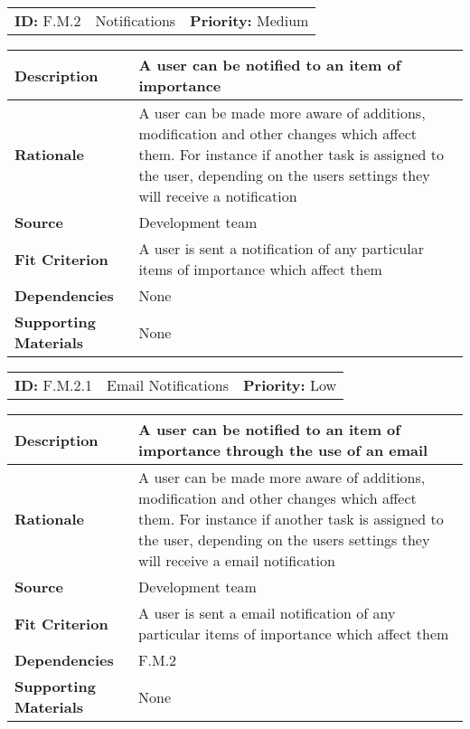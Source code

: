 \begin{table}[H]
    \begin{tabularx}{\textwidth}{| l | X | l |}
        \hline
        \textbf{ID:} F.M.2 & Notifications & \textbf{Priority:} Medium \\
    \end{tabularx}
    \begin{tabularx}{\textwidth}{| l | X |}
        \hline
        \textbf{Description} & A user can be notified to an item of importance \\ \hline
        \textbf{Rationale} & A user can be made more aware of additions, modification and other changes which affect them. For instance if another task is assigned to the user, depending on the users settings they will receive a notification\\ \hline
        \textbf{Source} &  Development team\\ \hline
        \textbf{Fit Criterion} & A user is sent a notification of any particular items of importance which affect them  \\ \hline
        \textbf{Dependencies} & None \\ \hline
        \textbf{Supporting Materials} & None \\ \hline
    \end{tabularx}
\end{table}

\begin{table}[H]
    \begin{tabularx}{\textwidth}{| l | X | l |}
        \hline
        \textbf{ID:} F.M.2.1 & Email Notifications & \textbf{Priority:} Low \\
    \end{tabularx}
    \begin{tabularx}{\textwidth}{| l | X |}
        \hline
        \textbf{Description} & A user can be notified to an item of importance through the use of an email\\ \hline
        \textbf{Rationale} & A user can be made more aware of additions, modification and other changes which affect them. For instance if another task is assigned to the user, depending on the users settings they will receive a email notification\\ \hline
        \textbf{Source} &  Development team\\ \hline
        \textbf{Fit Criterion} & A user is sent a email notification of any particular items of importance which affect them  \\ \hline
        \textbf{Dependencies} & F.M.2 \\ \hline
        \textbf{Supporting Materials} & None \\ \hline
    \end{tabularx}
\end{table}

